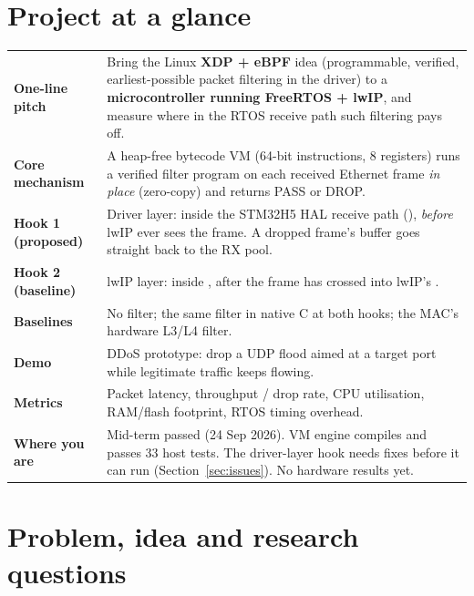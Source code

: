 \documentclass[10pt,a4paper]{article}
\begin{document}
\section{Project at a glance}
\begin{tabularx}{\textwidth}{@{}P{3.6cm}L@{}}
\toprule
\textbf{One-line pitch} & Bring the Linux \textbf{XDP + eBPF} idea (programmable, verified, earliest-possible packet filtering in the driver) to a \textbf{microcontroller running FreeRTOS + lwIP}, and measure where in the RTOS receive path such filtering pays off. \\
\textbf{Core mechanism} & A heap-free bytecode VM (64-bit instructions, 8 registers) runs a verified filter program on each received Ethernet frame \emph{in place} (zero-copy) and returns PASS or DROP. \\
\textbf{Hook 1 (proposed)} & Driver layer: inside the STM32H5 HAL receive path (), \emph{before} lwIP ever sees the frame. A dropped frame's buffer goes straight back to the RX pool. \\
\textbf{Hook 2 (baseline)} & lwIP layer:  inside , after the frame has crossed into lwIP's . \\
\textbf{Baselines} & No filter; the same filter in native C at both hooks; the MAC's hardware L3/L4 filter. \\
\textbf{Demo} & DDoS prototype: drop a UDP flood aimed at a target port while legitimate traffic keeps flowing. \\
\textbf{Metrics} & Packet latency, throughput / drop rate, CPU utilisation, RAM/flash footprint, RTOS timing overhead. \\
\textbf{Where you are} & Mid-term passed (24 Sep 2026). VM engine compiles and passes 33 host tests. The driver-layer hook needs fixes before it can run (Section~\ref{sec:issues}). No hardware results yet. \\
\bottomrule
\end{tabularx}

\section{Problem, idea and research questions}
\end{document}
